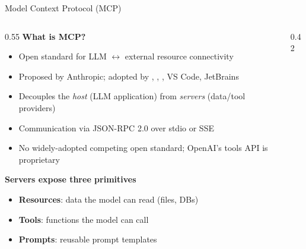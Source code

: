 \begin{frame}[shrink=18]{Model Context Protocol (MCP)}
  \begin{columns}[T, onlytextwidth]
    \begin{column}{0.55\textwidth}
      \textbf{What is MCP?}~\parencite{anthropic2024mcp}\\[0.3em]
      \begin{itemize}
        \item Open standard for LLM $\leftrightarrow$ external resource connectivity
        \item Proposed by Anthropic; adopted by , , ,  VS Code, JetBrains
        \item Decouples the \emph{host} (LLM application) from \emph{servers} (data/tool providers)
        \item Communication via JSON-RPC 2.0 over stdio or SSE
        \item No widely-adopted competing open standard; OpenAI's tools API is proprietary
      \end{itemize}
      \vspace{0.5em}
      \textbf{Servers expose three primitives}\\[0.3em]
      \begin{itemize}
        \item \textbf{Resources}: data the model can read (files, DBs)
        \item \textbf{Tools}: functions the model can call
        \item \textbf{Prompts}: reusable prompt templates
      \end{itemize}
    \end{column}
    \hfill
    \begin{column}{0.42\textwidth}
      \centering
\end{column}
\end{columns}
\end{frame}

